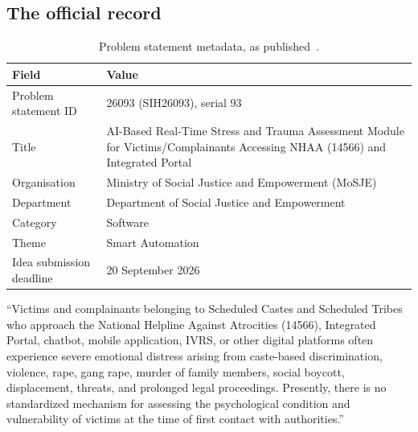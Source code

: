 \documentclass[11pt,a4paper]{article}
\newcommand{\codeus}{\textunderscore\allowbreak}
\DeclareRobustCommand{\code}[1]{{\ttfamily\let\_\codeus #1}}
\begin{document}
\subsection{The official record}
\begin{table}[!htbp]
\centering\small
\caption{Problem statement metadata, as published~\cite{sih26093}.}
\label{tab:psmeta}
\begin{tabularx}{\linewidth}{@{}>{\raggedright\arraybackslash}p{3.4cm}X@{}}
\toprule
Field & Value \\
\midrule
Problem statement ID & 26093 (\code{SIH26093}), serial 93 \\
Title & AI-Based Real-Time Stress and Trauma Assessment Module for Victims/Complainants Accessing NHAA (14566) and Integrated Portal \\
Organisation & Ministry of Social Justice and Empowerment (MoSJE) \\
Department & Department of Social Justice and Empowerment \\
Category & Software \\
Theme & Smart Automation \\
Idea submission deadline & 20 September 2026 \\
\bottomrule
\end{tabularx}
\end{table}

\begin{quotebox}[title={Background, as issued}]
\small
``Victims and complainants belonging to Scheduled Castes and Scheduled Tribes who approach the
National Helpline Against Atrocities (14566), Integrated Portal, chatbot, mobile application, IVRS,
or other digital platforms often experience severe emotional distress arising from caste-based
discrimination, violence, rape, gang rape, murder of family members, social boycott, displacement,
threats, and prolonged legal proceedings. Presently, there is no standardized mechanism for
assessing the psychological condition and vulnerability of victims at the time of first contact with
authorities.''
\end{quotebox}
\end{document}
